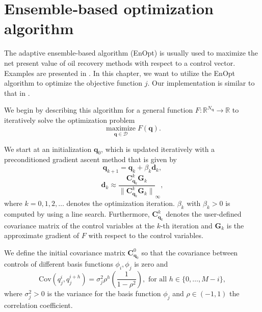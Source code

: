 \chapter{\label{ChapterEnsembleBasedOptimizationAlgorithm}Ensemble‑based optimization algorithm}

The adaptive ensemble-based algorithm (EnOpt) is usually used to maximize the net present value of oil recovery methods with respect to a control vector. Examples are presented in \cite{Keil2022-dj, OGUNTOLA2021109165, Zhang2023-sg}. In this chapter, we want to utilize the EnOpt algorithm to optimize the objective function $j$. Our implementation is similar to that in \cite{Keil2022-dj}.

We begin by describing this algorithm for a general function $F:\mathbb{R}^{N_\mathbf{q}}\to \mathbb{R}$ to iteratively solve the optimization problem
\begin{displaymath}
\operatorname*{maximize}_{\mathbf{q}\in\mathcal{D}}F(\mathbf{q}).
\end{displaymath}

We start at an initialization $\mathbf{q}_0$,  which is updated iteratively with a preconditioned gradient ascent method that is given by
\begin{displaymath}
\mathbf{q}_{k+1} = \mathbf{q}_k+\beta_k\mathbf{d}_k,
\end{displaymath}
\begin{displaymath}
\mathbf{d}_k\approx\frac{\mathbf{C}_{\mathbf{q}_k}^k\mathbf{G}_k}{\|\mathbf{C}_{\mathbf{q}_k}^k\mathbf{G}_k\|}_\infty,
\end{displaymath}
where $k=0,1,2,\dotsc$ denotes the optimization iteration. $\beta_k$ with $\beta_k>0$ is computed by using a line search. Furthermore, $\mathbf{C}_{\mathbf{q}_k}^k$ denotes the user-defined covariance matrix of the control variables at the $k$-th iteration and $\mathbf{G}_k$ is the approximate gradient of $F$ with respect to the control variables.

We define the initial covariance matrix $\mathbf{C}_{\mathbf{q}_0}^0$ so that the covariance between controls of different basis functions $\phi_i,\phi_j$ is zero and
\begin{equation}
\label{defineInitialCovariance}
\mathrm{Cov}(q_j^i,q_j^{i+h})=\sigma_j^2\rho^h\left(\frac{1}{1-\rho^2}\right),\text{ for all }h\in\{0,\dotsc,M-i\},
\end{equation}
where $\sigma_j^2>0$ is the variance for the basis function $\phi_j$ and $\rho\in(-1,1)$ the correlation coefficient.

